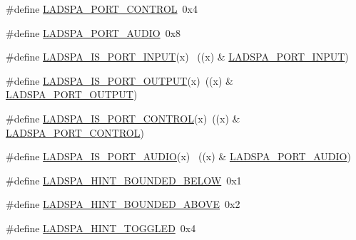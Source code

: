 \begin{DoxyCompactItemize}
\item 
\#define \hyperlink{win_2_l_a_d_s_p_a__plugins-win_2ladspa_8h_aab6694436132230b3efeadf1b1e90bf6}{L\+A\+D\+S\+P\+A\+\_\+\+P\+O\+R\+T\+\_\+\+C\+O\+N\+T\+R\+OL}~0x4
\item 
\#define \hyperlink{win_2_l_a_d_s_p_a__plugins-win_2ladspa_8h_ac5d2ee82b5210596205e72c40d4244ae}{L\+A\+D\+S\+P\+A\+\_\+\+P\+O\+R\+T\+\_\+\+A\+U\+D\+IO}~0x8
\item 
\#define \hyperlink{win_2_l_a_d_s_p_a__plugins-win_2ladspa_8h_a2983bb482871e60cc6229b632f69a4dd}{L\+A\+D\+S\+P\+A\+\_\+\+I\+S\+\_\+\+P\+O\+R\+T\+\_\+\+I\+N\+P\+UT}(x)  ~((x) \& \hyperlink{win_2_l_a_d_s_p_a__plugins-win_2ladspa_8h_a250d3bdf77d0de6abfe7def8b69dd5bb}{L\+A\+D\+S\+P\+A\+\_\+\+P\+O\+R\+T\+\_\+\+I\+N\+P\+UT})
\item 
\#define \hyperlink{win_2_l_a_d_s_p_a__plugins-win_2ladspa_8h_ae2ff93bdb0e43081f2817908e4a36d88}{L\+A\+D\+S\+P\+A\+\_\+\+I\+S\+\_\+\+P\+O\+R\+T\+\_\+\+O\+U\+T\+P\+UT}(x)~((x) \& \hyperlink{win_2_l_a_d_s_p_a__plugins-win_2ladspa_8h_a34b94dfb4391fe95181e9f367fa5b3e1}{L\+A\+D\+S\+P\+A\+\_\+\+P\+O\+R\+T\+\_\+\+O\+U\+T\+P\+UT})
\item 
\#define \hyperlink{win_2_l_a_d_s_p_a__plugins-win_2ladspa_8h_ae069ff071ef971bc20614bafa81d65ba}{L\+A\+D\+S\+P\+A\+\_\+\+I\+S\+\_\+\+P\+O\+R\+T\+\_\+\+C\+O\+N\+T\+R\+OL}(x)~((x) \& \hyperlink{win_2_l_a_d_s_p_a__plugins-win_2ladspa_8h_aab6694436132230b3efeadf1b1e90bf6}{L\+A\+D\+S\+P\+A\+\_\+\+P\+O\+R\+T\+\_\+\+C\+O\+N\+T\+R\+OL})
\item 
\#define \hyperlink{win_2_l_a_d_s_p_a__plugins-win_2ladspa_8h_ab2c04698082823837827b1ce00b13644}{L\+A\+D\+S\+P\+A\+\_\+\+I\+S\+\_\+\+P\+O\+R\+T\+\_\+\+A\+U\+D\+IO}(x)  ~((x) \& \hyperlink{win_2_l_a_d_s_p_a__plugins-win_2ladspa_8h_ac5d2ee82b5210596205e72c40d4244ae}{L\+A\+D\+S\+P\+A\+\_\+\+P\+O\+R\+T\+\_\+\+A\+U\+D\+IO})
\item 
\#define \hyperlink{win_2_l_a_d_s_p_a__plugins-win_2ladspa_8h_af8ca1d953bcce70b7ccd6a7309486e16}{L\+A\+D\+S\+P\+A\+\_\+\+H\+I\+N\+T\+\_\+\+B\+O\+U\+N\+D\+E\+D\+\_\+\+B\+E\+L\+OW}~0x1
\item 
\#define \hyperlink{win_2_l_a_d_s_p_a__plugins-win_2ladspa_8h_a0e83a89c12f9695c1d69b741479f3391}{L\+A\+D\+S\+P\+A\+\_\+\+H\+I\+N\+T\+\_\+\+B\+O\+U\+N\+D\+E\+D\+\_\+\+A\+B\+O\+VE}~0x2
\item 
\#define \hyperlink{win_2_l_a_d_s_p_a__plugins-win_2ladspa_8h_aa1f5195cb6d7b8502af552ec48db6a47}{L\+A\+D\+S\+P\+A\+\_\+\+H\+I\+N\+T\+\_\+\+T\+O\+G\+G\+L\+ED}~0x4
\item 

\end{DoxyCompactItemize}
